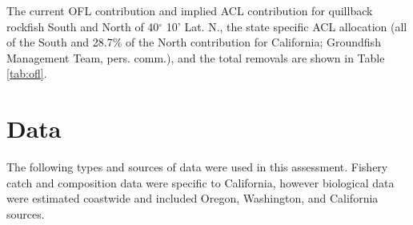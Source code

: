 \documentclass[11pt,
  english,
  a4paper,
]{article}
\begin{document}
\leavevmode\tagmcend\tagstructend\par


The current OFL contribution and implied ACL contribution for quillback rockfish South and North of 40{\(^\circ\)\leavevmode\tagmcend\tagstructend} 10' Lat. N., the state specific ACL allocation (all of the South and 28.7\% of the North contribution for California; Groundfish Management Team, pers. comm.), and the total removals are shown in Table \ref{tab:ofl}.

\leavevmode\tagmcend\tagstructend\par


\hypertarget{data}{%
\section{Data}\label{data}}

\leavevmode\tagmcend\tagstructend


The following types and sources of data were used in this assessment. Fishery catch and composition data were specific to California, however biological data were estimated coastwide and included Oregon, Washington, and California sources.

\leavevmode\tagmcend\tagstructend\par

\end{document}
